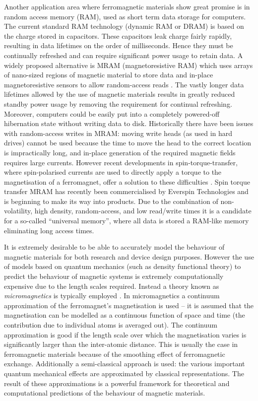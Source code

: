 Another application area where ferromagnetic materials show great promise is in random access memory (RAM), used as short term data storage for computers.
The current standard RAM technology (dynamic RAM or DRAM) is based on the charge stored in capacitors.
These capacitors leak charge fairly rapidly, resulting in data lifetimes on the order of milliseconds.
Hence they must be continually refreshed and can require significant power usage to retain data.
A widely proposed alternative is MRAM (magnetoresistive RAM) which uses arrays of nano-sized regions of magnetic material to store data and in-place magnetoresistive sensors to allow random-access reads \cite[Sec. 14.4]{Kronmuller1997}.
The vastly longer data lifetimes allowed by the use of magnetic materials results in greatly reduced standby power usage by removing the requirement for continual refreshing.
Moreover, computers could be easily put into a completely powered-off hibernation state without writing data to disk.
Historically there have been issues with random-access writes in MRAM: moving write heads (as used in hard drives) cannot be used because the time to move the head to the correct location is impractically long, and in-place generation of the required magnetic fields requires large currents.
However recent developments in spin-torque-transfer, where spin-polarised currents are used to directly apply a torque to the magnetisation of a ferromagnet, offer a solution to these difficulties \cite{Apalkov2013}.
Spin torque transfer MRAM has recently been commercialised by Everspin Technologies \cite{everspin} and is beginning to make its way into products.
Due to the combination of non-volatility, high density, random-access, and low read/write times it is a candidate for a so-called ``universal memory'', where all data is stored a RAM-like memory eliminating long access times.


It is extremely desirable to be able to accurately model the behaviour of magnetic materials for both research and device design purposes.
However the use of models based on quantum mechanics (such as density functional theory) to predict the behaviour of magnetic systems is extremely computationally expensive due to the length scales required.
Instead a theory known as \emph{micromagnetics} is typically employed \cite{Aharoni1996}.
In micromagnetics a continuum approximation of the ferromagnet's magnetisation is used -- it is  assumed that the magnetisation can be modelled as a continuous function of space and time (\ie the contribution due to individual atoms is averaged out).
The continuum approximation is good if the length scale over which the magnetisation varies is significantly larger than the inter-atomic distance.
This is usually the case in ferromagnetic materials because of the smoothing effect of ferromagnetic exchange.
Additionally a semi-classical approach is used: the various important quantum mechanical effects are approximated by classical representations.
The result of these approximations is a powerful framework for theoretical and computational predictions of the behaviour of magnetic materials.

